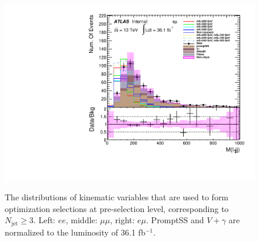 \begin{figure}[h]
\begin{minipage}[t]{0.33\linewidth}
 \includegraphics[width=1.0\textwidth,angle=-90]{fig/dataMC_high_Njet_CR/m_l1jj_emu.pdf}\label{fig:dataMC_high_Njet_CR:m_l1jj_emu.pdf}
 \end{minipage}
 \caption{The distributions of kinematic variables that are used to form optimization selections at pre-selection level, corresponding to $N_{\text{jet}}\geq3$. Left: $ee$, middle: $\mu\mu$, right: $e\mu$. PromptSS and $V+\gamma$ are normalized to the luminosity of 36.1 fb$^{-1}$.}
\label{fig:SigOpt_high_kine}
\end{figure}
